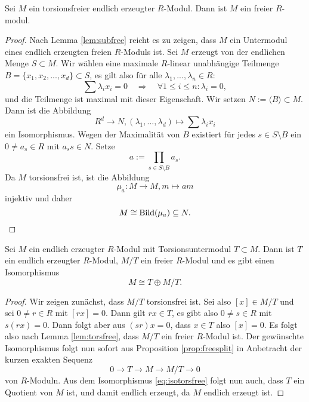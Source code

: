 \documentclass{book}
\begin{document}
\begin{lem}
    \label{lem:torsfree}
    Sei $M$ ein torsionsfreier endlich erzeugter $R$-Modul. Dann ist $M$ ein freier $R$-modul.
\end{lem}
\begin{proof}
    Nach Lemma \ref{lem:subfree} reicht es zu zeigen, dass $M$ ein Untermodul
    eines endlich erzeugten freien $R$-Moduls ist. Sei $M$ erzeugt von der
    endlichen Menge $S \subset M$. Wir wählen eine maximale $R$-linear
    unabhängige Teilmenge $B = \{x_1, x_2, ..., x_d \} \subset S$, es gilt also für alle $\lambda_1, ..., \lambda_n \in R$:
    \[
        \sum \lambda_i x_i = 0 \quad \Rightarrow \quad \forall 1 \le i \le n: \lambda_i = 0,
    \]
    und die Teilmenge ist maximal mit dieser Eigenschaft. Wir setzen $N := \langle B \rangle \subset M$. Dann ist die Abbildung
    \[
        R^d \to N, (\lambda_1, ..., \lambda_d) \mapsto \sum \lambda_i x_i
    \]
    ein Isomorphismus. Wegen der Maximalität von $B$ existiert für jedes $s \in
    S \setminus B$ ein $0 \ne a_s \in R$ mit $a_s s \in N$. Setze
    \[
        a := \prod_{s \in S \setminus B} a_s.
    \]
    Da $M$ torsionsfrei ist, ist die Abbildung 
    \[
        \mu_a: M \to M, m \mapsto am
    \]
    injektiv und daher
    \[
        M \cong \operatorname{Bild}(\mu_a) \subseteq N.
    \]
\end{proof}

\begin{lem}
    \label{lem:tfree}
    Sei $M$ ein endlich erzeugter $R$-Modul mit Torsionsuntermodul $T \subset
    M$. Dann ist $T$ ein endlich erzeugter $R$-Modul, $M/T$ ein freier
    $R$-Modul und es gibt einen Isomorphismus
    \begin{equation}
        \label{eq:isotorsfree}
            M \cong T \oplus M/T.
    \end{equation}
\end{lem}
\begin{proof}
    Wir zeigen zunächst, dass $M/T$ torsionsfrei ist. Sei also $[x] \in M/T$ und sei $0
    \ne r \in R$ mit $[rx] = 0$. Dann gilt $rx \in T$, es gibt also $0 \ne s
    \in R$ mit $s(rx) = 0$. Dann folgt aber aus $(sr)x = 0$, dass $x \in T$
    also $[x] = 0$. Es folgt also nach Lemma \ref{lem:torsfree}, dass $M/T$ ein
    freier $R$-Modul ist. Der gewünschte Isomorphismus folgt nun sofort aus
    Proposition \ref{prop:freesplit} in Anbetracht der kurzen exakten Sequenz
    \[
        0 \to T \to M \to M/T \to 0
    \]
    von $R$-Moduln. Aus dem Isomorphismus \eqref{eq:isotorsfree} folgt nun
    auch, dass $T$ ein Quotient von $M$ ist, und damit endlich erzeugt, da $M$
    endlich erzeugt ist. 
\end{proof}
\end{document}

